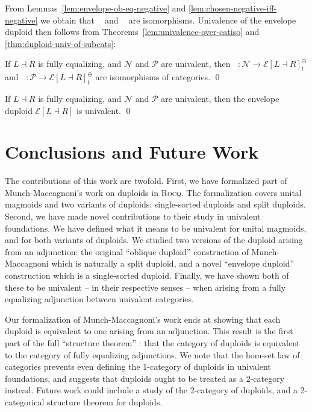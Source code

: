 \documentclass[runningheads]{llncs}
\newcommand*\rocqlogo{\usebox{\rocqlogobox}}
\newcommand{\lemmaref}[3]{\href{https://github.com/UniMath/UniMath/blob/94fae0eda57a778cec704bfa73b4ff525c9bc475/#1\#L#2?name=#3}{\rocqlogo}}
\newcommand{\acat}[1]{\mathcal{#1}}
\newcommand{\PP}{\acat{P}}
\newcommand{\NN}{\acat{N}}
\newcommand{\EE}{\acat{E}}
\newcommand{\Cl}[1]{#1_l}
\newcommand{\Ct}[1]{#1_t}
\newcommand{\Cn}[1]{#1^\ominus}
\newcommand{\Cp}[1]{#1^\oplus}
\newcommand{\Cnl}[1]{\Cn{\Cl{#1}}}
\newcommand{\Cpt}[1]{\Cp{\Ct{#1}}}
\newcommand{\Env}[1]{\EE[#1]}
\newcommand{\innegE}{\mathop{\iota^{\ominus}_{\EE}}}
\newcommand{\inposE}{\mathop{\iota^{\oplus}_{\EE}}}
\begin{document}
From Lemmas~\ref{lem:envelope-ob-eq-negative} and
\ref{lem:chosen-negative-iff-negative} we obtain that \(\innegE\) and
\(\inposE\) are isomorphisms. Univalence of the envelope duploid then
follows from Theorems~\ref{lem:univalence-over-catiso} and
\ref{thm:duploid-univ-of-subcats}:

\begin{theorem}[{\lemmaref{UniMath/CategoryTheory/Nonassociative/Duploids/FromAdjunction/EqualizingRequirement.v}{873}{is\_catiso\_negative\_to\_envelope\_duploid}}]
\label{lem:envelope-inj-isos}
If \(L \dashv R\) is fully equalizing, and \(\NN\) and \(\PP\) are
univalent, then \(\innegE \colon \NN \to \Cnl{\Env{L \dashv R}}\) and
\(\inposE \colon \PP \to \Cpt{\Env{L \dashv R}}\) are isomorphisms of
categories.
\qed
\end{theorem}

\begin{theorem}[{\lemmaref{UniMath/CategoryTheory/Nonassociative/Duploids/FromAdjunction/EqualizingRequirement.v}{914}{is\_univalent\_envelope\_duploid}}]
\label{thm:envelope-univalent}
If \(L \dashv R\) is fully equalizing, and \(\NN\) and \(\PP\) are
univalent, then the envelope duploid \(\Env{L \dashv R}\) is
univalent.
\qed
\end{theorem}
\section{Conclusions and Future Work}
\label{sec:conclusions}
The contributions of this work are twofold. First, we have formalized
part of Munch\hyp{}Maccagnoni's work on duploids \cite{MunchMaccagnoni14,MunchMaccagnoni13} in \textsc{Rocq}. The formalization covers
unital magmoids and two variants of duploids: single\hyp{}sorted duploids
and split duploids. Second, we have made novel contributions to their
study in univalent foundations. We have defined what it means to be
univalent for unital magmoids, and for both variants of duploids. We
studied two versions of the duploid arising from an adjunction: the
original ``oblique duploid'' construction of Munch\hyp{}Maccagnoni
\cite{MunchMaccagnoni14} which is naturally a split duploid, and a
novel ``envelope duploid'' construction which is a single\hyp{}sorted
duploid. Finally, we have shown both of these to be univalent -- in
their respective senses -- when arising from a fully equalizing
adjunction between univalent categories.

Our formalization of Munch\hyp{}Maccagnoni's work ends at
showing that each duploid is equivalent to one arising from an
adjunction. This result is the first part of the full ``structure
theorem'' \cite{MunchMaccagnoni14}: that the category of duploids is
equivalent to the category of fully equalizing adjunctions. We note
that the hom\hyp{}set law of categories prevents even defining the
1-category of duploids in univalent foundations, and suggests that
duploids ought to be treated as a 2-category instead. Future work
could include a study of the 2-category of duploids, and a
2-categorical structure theorem for duploids.
\end{document}
